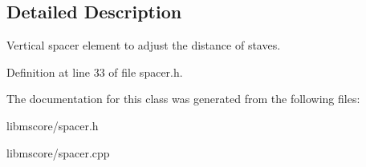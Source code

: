 \subsection{Detailed Description}
Vertical spacer element to adjust the distance of staves. 

Definition at line 33 of file spacer.\+h.



The documentation for this class was generated from the following files\+:\begin{DoxyCompactItemize}
\item 
libmscore/spacer.\+h\item 
libmscore/spacer.\+cpp\end{DoxyCompactItemize}
